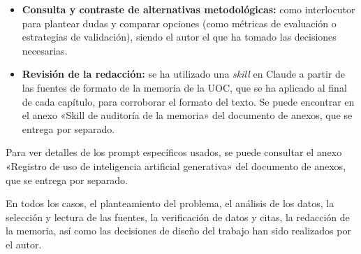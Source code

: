 \begin{itemize}
    \item \textbf{Consulta y contraste de alternativas metodológicas:} como interlocutor para plantear dudas y comparar opciones (como métricas de evaluación o estrategias de validación), siendo el autor el que ha tomado las decisiones necesarias.
    \item \textbf{Revisión de la redacción:} se ha utilizado una \textit{skill} en Claude a partir de las fuentes de formato de la memoria de la UOC, que se ha aplicado al final de cada capítulo, para corroborar el formato del texto. Se puede encontrar en el anexo «Skill de auditoría de la memoria» del documento de anexos, que se entrega por separado.
\end{itemize}

Para ver detalles de los prompt específicos usados, se puede consultar el anexo «Registro de uso de inteligencia artificial generativa» del documento de anexos, que se entrega por separado.

En todos los casos, el planteamiento del problema, el análisis de los datos, la selección y lectura de las fuentes, la verificación de datos y citas, la redacción de la memoria, así como las decisiones de diseño del trabajo han sido realizados por el autor.